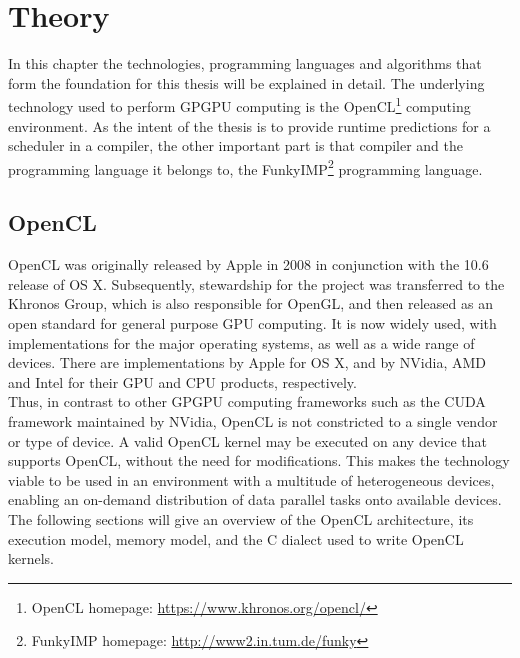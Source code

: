 
\chapter{Theory}
\label{chap:theory}

In this chapter the technologies, programming languages and algorithms that form the foundation for this thesis will be explained in detail. The underlying technology used to perform GPGPU computing is the  OpenCL\footnote{OpenCL homepage: \url{https://www.khronos.org/opencl/}} computing environment. As the intent of the thesis is to provide runtime predictions for a scheduler in a compiler, the other important part is that compiler and the programming language it belongs to, the FunkyIMP\footnote{FunkyIMP homepage: \url{http://www2.in.tum.de/funky}} programming language. 


\section{OpenCL}
\label{sect:theory_opencl}
OpenCL was originally released by Apple in 2008 in conjunction with the 10.6 release of OS X. Subsequently, stewardship for the project was transferred to the Khronos Group, which is also responsible for OpenGL, and then released as an open standard for general purpose GPU computing. It is now widely used, with implementations for the major operating systems, as well as a wide range of devices. There are implementations by Apple for OS X, and by NVidia, AMD and Intel for their GPU and CPU products, respectively. \cite{khronos2008release,apple2013opencl} \\

Thus, in contrast to other GPGPU computing frameworks such as the CUDA framework maintained by NVidia, OpenCL is not constricted to a single vendor or type of device. A valid OpenCL kernel may be executed on any device that supports OpenCL, without the need for modifications. This makes the technology viable to be used in an environment with a multitude of heterogeneous devices, enabling an on-demand distribution of data parallel tasks onto available devices. \cite{vejarano2013parallel} \\

The following sections will give an overview of the OpenCL architecture, its execution model, memory model, and the C dialect used to write OpenCL kernels.


